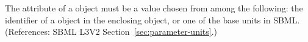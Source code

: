 The  attribute of a \Parameter object must be a value chosen
from among the following: the identifier of a \UnitDefinition object in the
enclosing \Model object, or one of the base units in SBML.  (References:
SBML L3V2 Section~\ref{sec:parameter-units}.)
